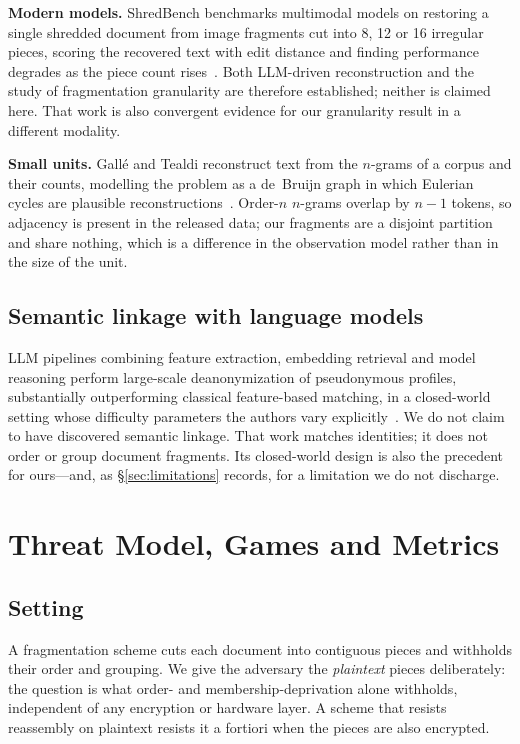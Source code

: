 \documentclass[sigconf,nonacm]{acmart}
\begin{document}
\textbf{Modern models.} ShredBench benchmarks multimodal models on restoring a
single shredded document from image fragments cut into 8, 12 or 16 irregular
pieces, scoring the recovered text with edit distance and finding performance
degrades as the piece count rises~\cite{shredbench2026}. Both LLM-driven
reconstruction and the study of fragmentation granularity are therefore
established; neither is claimed here. That work is also convergent evidence for
our granularity result in a different modality.

\textbf{Small units.} Gallé and Tealdi reconstruct text from the $n$-grams of a
corpus and their counts, modelling the problem as a de~Bruijn graph in which
Eulerian cycles are plausible reconstructions~\cite{galle2015}. Order-$n$
$n$-grams overlap by $n-1$ tokens, so adjacency is present in the released data;
our fragments are a disjoint partition and share nothing, which is a difference
in the observation model rather than in the size of the unit.

\subsection{Semantic linkage with language models}
LLM pipelines combining feature extraction, embedding retrieval and model
reasoning perform large-scale deanonymization of pseudonymous profiles,
substantially outperforming classical feature-based matching, in a closed-world
setting whose difficulty parameters the authors vary
explicitly~\cite{lermen2026}. We do not claim to have discovered semantic
linkage. That work matches identities; it does not order or group document
fragments. Its closed-world design is also the precedent for ours---and, as
\S\ref{sec:limitations} records, for a limitation we do not discharge.

\section{Threat Model, Games and Metrics}
\label{sec:model}

\subsection{Setting}
A fragmentation scheme cuts each document into contiguous pieces and withholds
their order and grouping. We give the adversary the \emph{plaintext} pieces
deliberately: the question is what order- and membership-deprivation alone
withholds, independent of any encryption or hardware layer. A scheme that resists
reassembly on plaintext resists it a fortiori when the pieces are also encrypted.
\end{document}
